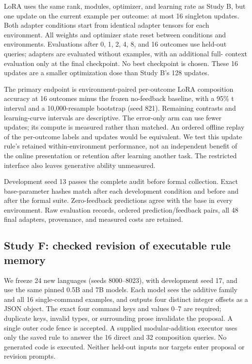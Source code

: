 \documentclass[11pt]{article}
\begin{document}
LoRA uses the same rank, modules, optimizer, and learning rate as Study B,
but one update on the current example per outcome: at most 16 singleton
updates. Both adapter conditions start from identical adapter tensors for each
environment. All weights and optimizer state reset between conditions and
environments. Evaluations after 0, 1, 2, 4, 8, and 16 outcomes use held-out
queries; adapters are evaluated without examples, with an additional full-
context evaluation only at the final checkpoint. No best checkpoint is chosen.
These 16 updates are a smaller optimization dose than Study B's 128 updates.

The primary endpoint is environment-paired per-outcome LoRA composition
accuracy at 16 outcomes minus the frozen no-feedback baseline, with a 95\% t
interval and a 10,000-resample bootstrap (seed 821). Remaining contrasts and
learning-curve intervals are descriptive. The error-only arm can use fewer
updates; its compute is measured rather than matched. An ordered offline
replay of the per-outcome labels and updates would be equivalent. We test this
update rule's retained within-environment performance, not an independent
benefit of the online presentation or retention after learning another task.
The restricted interface also leaves generative ability unmeasured.

Development seed 13 passes the complete audit before formal collection.
Exact base-parameter hashes match after each development condition and before
and after the formal suite. Zero-feedback predictions agree with the base
in every environment. Raw evaluation records, ordered prediction/feedback
pairs, all 48 final adapters, provenance, and measured costs are retained.

\subsection{Study F: checked revision of executable rule memory}
We freeze 24 new languages (seeds 8000--8023), with development seed 17,
and use the same pinned 0.5B and 7B models. Each model sees the additive
family and all 16 single-command examples, and outputs four distinct integer
offsets as a JSON object. The exact four command keys and values 0--7 are
required; duplicate keys, invalid types, or surrounding prose invalidate the
proposal. A single outer code fence is accepted. A supplied modular-addition
executor uses only the saved rule to answer the 16 direct and 32 composition
queries. No generated code is executed. Neither held-out inputs nor targets
enter proposal or revision prompts.
\end{document}
